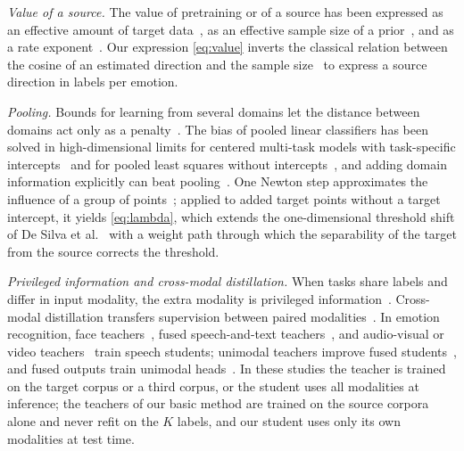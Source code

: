 \emph{Value of a source.}
The value of pretraining or of a source has been expressed as an effective amount of target data~\cite{hernandez2021scaling,lescao2021data}, as an effective sample size of a prior~\cite{wiesenfarth2020quantification}, and as a rate exponent~\cite{hanneke2019value}.
Our expression \eqref{eq:value} inverts the classical relation between the cosine of an estimated direction and the sample size~\cite{raudys1998intrinsic,dobriban2018highdimensional} to express a source direction in labels per emotion.

\emph{Pooling.}
Bounds for learning from several domains let the distance between domains act only as a penalty~\cite{bendavid2010theory,blitzer2007learning}.
The bias of pooled linear classifiers has been solved in high-dimensional limits for centered multi-task models with task-specific intercepts~\cite{tiomoko2021deciphering} and for pooled least squares without intercepts~\cite{yang2025precise}, and adding domain information explicitly can beat pooling~\cite{zhu2026domain}.
One Newton step approximates the influence of a group of points~\cite{pregibon1981logistic,koh2019accuracy}; applied to added target points without a target intercept, it yields \eqref{eq:lambda}, which extends the one-dimensional threshold shift of De Silva et al.~\cite{desilva2023value} with a weight path through which the separability of the target from the source corrects the threshold.

\emph{Privileged information and cross-modal distillation.}
When tasks share labels and differ in input modality, the extra modality is privileged information~\cite{vapnik2009new,lopezpaz2016unifying}.
Cross-modal distillation transfers supervision between paired modalities~\cite{gupta2016cross}.
In emotion recognition, face teachers~\cite{albanie2018emotion}, fused speech-and-text teachers~\cite{srinivasan2022representation}, and audio-visual or video teachers~\cite{pendyala2025leveraging,hajavi2024audio} train speech students; unimodal teachers improve fused students~\cite{du2021improving,xue2021multimodal,rakib2025g2d}, and fused outputs train unimodal heads~\cite{jaritz2020xmuda}.
In these studies the teacher is trained on the target corpus or a third corpus, or the student uses all modalities at inference; the teachers of our basic method are trained on the source corpora alone and never refit on the $K$ labels, and our student uses only its own modalities at test time.

